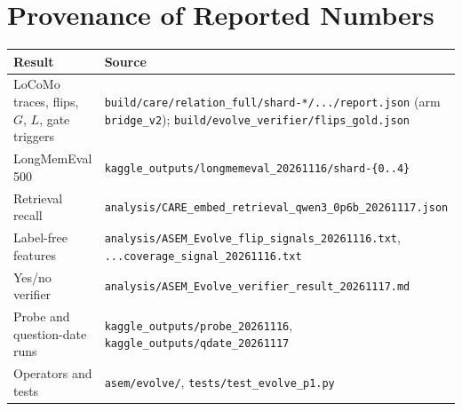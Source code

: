 \documentclass[10pt]{article}
\theoremstyle{plain}
\theoremstyle{definition}
\theoremstyle{remark}
\begin{document}
\section{Provenance of Reported Numbers}

{\footnotesize
\begin{tabular}{>{\raggedright\arraybackslash}p{4.0cm}>{\raggedright\arraybackslash}p{11.5cm}}
\toprule
Result & Source \\
\midrule
LoCoMo traces, flips, $G$, $L$, gate triggers & \texttt{build/care/relation\_full/\allowbreak shard-*/.../report.json} (arm \texttt{bridge\_v2}); \texttt{build/evolve\_verifier/\allowbreak flips\_gold.json} \\
LongMemEval 500 & \texttt{kaggle\_outputs/\allowbreak longmemeval\_20261116/\allowbreak shard-\{0..4\}} \\
Retrieval recall & \texttt{analysis/\allowbreak CARE\_embed\_retrieval\_qwen3\_0p6b\_20261117.json} \\
Label-free features & \texttt{analysis/\allowbreak ASEM\_Evolve\_flip\_signals\_20261116.txt}, \texttt{...coverage\_signal\_20261116.txt} \\
Yes/no verifier & \texttt{analysis/\allowbreak ASEM\_Evolve\_verifier\_result\_20261117.md} \\
Probe and question-date runs & \texttt{kaggle\_outputs/\allowbreak probe\_20261116}, \texttt{kaggle\_outputs/\allowbreak qdate\_20261117} \\
Operators and tests & \texttt{asem/evolve/}, \texttt{tests/\allowbreak test\_evolve\_p1.py} \\
\bottomrule
\end{tabular}}
\end{document}
